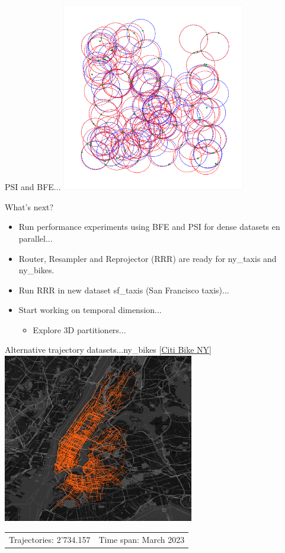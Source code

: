 \documentclass{beamer}
\begin{document}
\begin{frame}{PSI and BFE...}
    \centering
    \includegraphics[width=0.6\textwidth]{figures/psi9}
\end{frame}

\begin{frame}{What's next?}
  \begin{itemize}
          \item Run performance experiments using BFE and PSI for dense datasets en parallel...
          \item Router, Resampler and Reprojector (RRR) are ready for ny\_taxis and ny\_bikes.
          \item Run RRR in new dataset sf\_taxis (San Francisco taxis)...
          \item Start working on temporal dimension...
          \begin{itemize}
                  \item Explore 3D partitioners...
          \end{itemize}
  \end{itemize}
\end{frame}

\begin{frame}{Alternative trajectory datasets...}{ny\_bikes [\href{https://citibikenyc.com/system-data}{Citi Bike NY}]}
    \centering
    \includegraphics[width=0.625\textwidth]{figures/ny_bikes}
    \begin{tabular}{r r}
            \small Trajectories: 2'734.157 & \small Time span: March 2023
    \end{tabular}
\end{frame}
\end{document}
